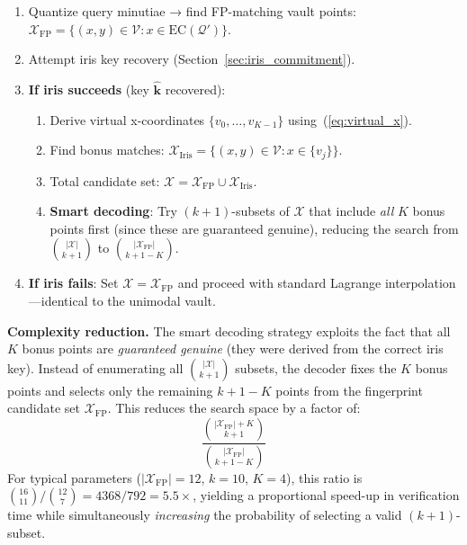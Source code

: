 \documentclass[conference]{IEEEtran}
\begin{document}
\begin{enumerate}
    \item Quantize query minutiae → find FP-matching vault points: $\mathcal{X}_{\text{FP}} = \{(x,y) \in \mathcal{V} : x \in \text{EC}(\mathcal{Q}')\}$.
    \item Attempt iris key recovery (Section~\ref{sec:iris_commitment}).
    \item \textbf{If iris succeeds} (key $\hat{\mathbf{k}}$ recovered):
    \begin{enumerate}
        \item Derive virtual x-coordinates $\{v_0, \ldots, v_{K-1}\}$ using~(\ref{eq:virtual_x}).
        \item Find bonus matches: $\mathcal{X}_{\text{Iris}} = \{(x,y) \in \mathcal{V} : x \in \{v_j\}\}$.
        \item Total candidate set: $\mathcal{X} = \mathcal{X}_{\text{FP}} \cup \mathcal{X}_{\text{Iris}}$.
        \item \textbf{Smart decoding}: Try $(k{+}1)$-subsets of $\mathcal{X}$ that include \emph{all} $K$ bonus points first (since these are guaranteed genuine), reducing the search from $\binom{|\mathcal{X}|}{k+1}$ to $\binom{|\mathcal{X}_{\text{FP}}|}{k+1-K}$.
    \end{enumerate}
    \item \textbf{If iris fails}: Set $\mathcal{X} = \mathcal{X}_{\text{FP}}$ and proceed with standard Lagrange interpolation---identical to the unimodal vault.
\end{enumerate}

\noindent\textbf{Complexity reduction.} The smart decoding strategy exploits the fact that all $K$ bonus points are \emph{guaranteed genuine} (they were derived from the correct iris key). Instead of enumerating all $\binom{|\mathcal{X}|}{k+1}$ subsets, the decoder fixes the $K$ bonus points and selects only the remaining $k+1-K$ points from the fingerprint candidate set $\mathcal{X}_{\text{FP}}$. This reduces the search space by a factor of:
\begin{equation}
    \frac{\binom{|\mathcal{X}_{\text{FP}}| + K}{k+1}}{\binom{|\mathcal{X}_{\text{FP}}|}{k+1-K}}
    \label{eq:complexity_reduction}
\end{equation}
For typical parameters ($|\mathcal{X}_{\text{FP}}| = 12$, $k = 10$, $K = 4$), this ratio is $\binom{16}{11}/\binom{12}{7} = 4368/792 = 5.5\times$, yielding a proportional speed-up in verification time while simultaneously \emph{increasing} the probability of selecting a valid $(k{+}1)$-subset.
\end{document}
